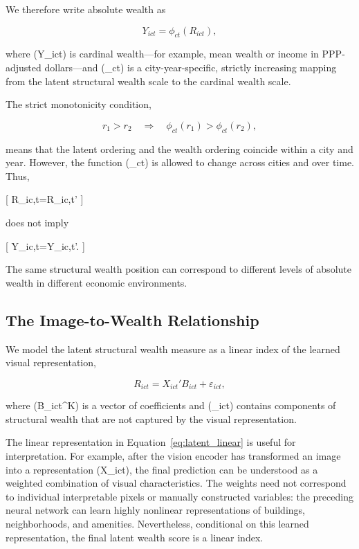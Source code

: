 We therefore write absolute wealth as

\begin{equation}
Y_{ict}=\phi_{ct}(R_{ict}),
\label{eq:cardinal_mapping}
\end{equation}

where (Y_{ict}) is cardinal wealth---for example, mean wealth or income in PPP-adjusted dollars---and (\phi_{ct}) is a city-year-specific, strictly increasing mapping from the latent structural wealth scale to the cardinal wealth scale.

The strict monotonicity condition,

\begin{equation}
r_1>r_2
\quad\Longrightarrow\quad
\phi_{ct}(r_1)>\phi_{ct}(r_2),
\label{eq:monotonic_phi}
\end{equation}

means that the latent ordering and the wealth ordering coincide within a city and year. However, the function (\phi_{ct}) is allowed to change across cities and over time. Thus,

[
R_{ic,t}=R_{ic,t'}
]

does not imply

[
Y_{ic,t}=Y_{ic,t'}.
]

The same structural wealth position can correspond to different levels of absolute wealth in different economic environments.

\subsection{The Image-to-Wealth Relationship}

We model the latent structural wealth measure as a linear index of the learned visual representation,

\begin{equation}
R_{ict}=X_{ict}'B_{ict}+\varepsilon_{ict},
\label{eq:latent_linear}
\end{equation}

where (B_{ict}\in{}^{K}) is a vector of coefficients and (\varepsilon_{ict}) contains components of structural wealth that are not captured by the visual representation.

The linear representation in Equation~\eqref{eq:latent_linear} is useful for interpretation. For example, after the vision encoder has transformed an image into a representation (X_{ict}), the final prediction can be understood as a weighted combination of visual characteristics. The weights need not correspond to individual interpretable pixels or manually constructed variables: the preceding neural network can learn highly nonlinear representations of buildings, neighborhoods, and amenities. Nevertheless, conditional on this learned representation, the final latent wealth score is a linear index.

